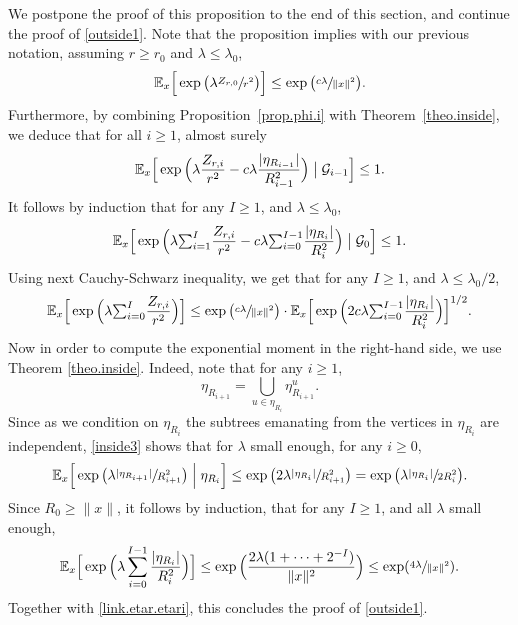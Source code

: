 \documentclass[JEP,XML,SOM,Unicode,NoFloatCountersInSection,published]{cedram}
\let\ts\textstyle
\theoremstyle{plain}
\theoremstyle{definition}
\newcommand{\1}{{\text{\Large $\mathfrak 1$}}}
\begin{document}
We postpone the proof of this proposition to the end of this section, and continue the proof of \eqref{outside1}.
Note that the proposition implies with our previous notation, assuming $r\ge r_0$ and $\lambda\le \lambda_0$,
\begin{equation*}
\mathbb E_x\Big[\exp\big(\lambda\sfrac{Z_{r,0}}{r^2}\big)\Big] \le \exp\big(\sfrac{c\lambda}{\|x\|^2}\big).
\end{equation*}
Furthermore, by combining Proposition~\ref{prop.phi.i} with Theorem~\ref{theo.inside}, we deduce that for all $i\ge 1$,
almost surely
\begin{equation*}
\mathbb E_x\Big[\exp\Big(\lambda\frac{Z_{r,i}}{r^2}
- c\lambda\frac{ |\eta_{R_{i-1}}|}{R_{i-1}^2}\Big)\bigm| \mathcal G_{i-1}\Big] \le 1.
\end{equation*}
It follows by induction that for any $I\ge 1$, and $\lambda\le \lambda_0$,
\[
\mathbb E_x\Big[\exp\Big(\lambda{\ts\sum_{i=1}^I} \frac{ Z_{r,i}}{r^2}
-c\lambda {\ts\sum_{i=0}^{I-1}}\frac{ |\eta_{R_i}|}{R_i^2}\Big)
\bigm| \mathcal G_0
\Big] \le 1.
\]
Using next Cauchy-Schwarz inequality, we get that for any $I\ge 1$, and $\lambda\le \lambda_0/2$,
\[
\mathbb E_x\Big[\exp\Big(\lambda {\ts\sum_{i=0}^I}
\frac{ Z_{r,i}}{r^2} \Big)\Big]
\le \exp\big(\sfrac{c\lambda}{\|x\|^2}\big) \cdot
\mathbb E_x\Big[\exp\Big(2c\lambda {\ts\sum_{i=0}^{I-1}}
\frac{ |\eta_{R_i}|}{R_i^2}\Big)\Big]^{1/2}.
\]
Now in order to compute the exponential moment in the right-hand side,
we use Theorem \ref{theo.inside}. Indeed, note that for any $i\ge 1$,
\begin{equation*}
\eta_{R_{i+1}} = \bigcup_{u\in \eta_{R_i}}
\eta^u_{R_{i+1}}.
\end{equation*}
Since as we condition on $ \eta_{R_i}$ the subtrees emanating from the vertices in
$\eta_{R_i}$ are independent,
\eqref{inside3} shows that for $\lambda$ small enough, for any $i\ge 0$,
\begin{equation*}
\mathbb E_x\Big[\exp\big(\lambda \sfrac{ |\eta_{R_{i+1}}|}{R_{i+1}^2}\big)
\Bigm|\eta_{R_i}\Big]
\le \exp\big(2\lambda \sfrac{ |\eta_{R_i}|}{R_{i+1}^2}\big)
= \exp\big(\lambda \sfrac{ |\eta_{R_i}|}{2R_i^2}\big).
\end{equation*}
Since $R_0\ge \|x\|$, it follows by induction, that
for any $I\ge 1$, and all $\lambda$ small enough,
\begin{equation*}
\mathbb E_x\Big[\exp\Big(\lambda \sum_{i=0}^{I-1}
\frac{ |\eta_{R_i}|}{R_i^2}\Big)\Big]
\le \exp\Big(\frac{2\lambda(1+\dots+2^{-I})}{\|x\|^2}\Big)
\le \exp(\sfrac{4\lambda}{\|x\|^2}).
\end{equation*}
Together with \eqref{link.etar.etari}, this concludes the proof of \eqref{outside1}.
\end{document}
